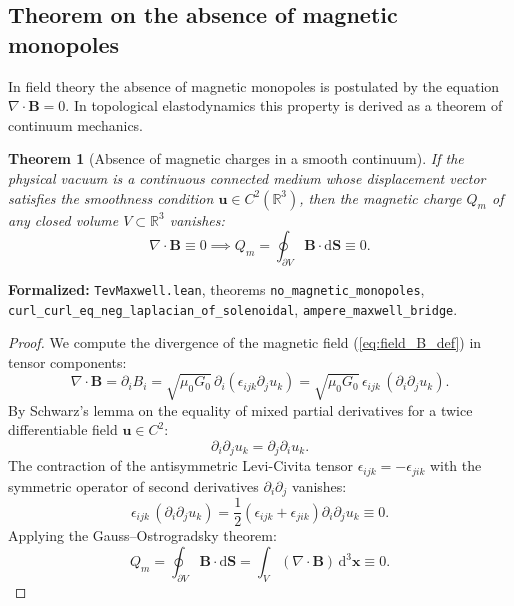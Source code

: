 \documentclass[11pt,a4paper]{article}
\newtheorem{theorem}{Theorem}
\theoremstyle{definition}
\theoremstyle{remark}
\begin{document}
\subsection{Theorem on the absence of magnetic monopoles}
	
In field theory the absence of magnetic monopoles is postulated by the equation $\nabla \cdot \mathbf{B} = 0$. In topological elastodynamics this property is derived as a theorem of continuum mechanics.
	
\begin{theorem}[Absence of magnetic charges in a smooth continuum]
\label{thm:no_monopoles}
If the physical vacuum is a continuous connected medium whose displacement vector satisfies the smoothness condition $\mathbf{u} \in C^2(\mathbb{R}^3)$, then the magnetic charge $Q_m$ of any closed volume $V \subset \mathbb{R}^3$ vanishes:
\begin{equation}
	\nabla \cdot \mathbf{B} \equiv 0 \implies Q_m = \oint_{\partial V} \mathbf{B} \cdot \mathrm{d}\mathbf{S} \equiv 0.
	\label{eq:div_B_zero_theorem}
\end{equation}
\end{theorem}

\noindent\small\textbf{Formalized:} \texttt{TevMaxwell.lean}, theorems \texttt{no\_magnetic\_monopoles}, \texttt{curl\_curl\_eq\_neg\_laplacian\_of\_solenoidal}, \texttt{ampere\_maxwell\_bridge}.


\begin{proof}
We compute the divergence of the magnetic field (\ref{eq:field_B_def}) in tensor components:
\begin{equation}
	\nabla \cdot \mathbf{B} = \partial_i B_i = \sqrt{\mu_0 G_0} \, \partial_i (\epsilon_{ijk} \partial_j u_k) = \sqrt{\mu_0 G_0} \, \epsilon_{ijk} \, (\partial_i \partial_j u_k).
\end{equation}
By Schwarz's lemma on the equality of mixed partial derivatives for a twice differentiable field $\mathbf{u} \in C^2$:
\begin{equation}
	\partial_i \partial_j u_k = \partial_j \partial_i u_k.
\end{equation}
The contraction of the antisymmetric Levi-Civita tensor $\epsilon_{ijk} = -\epsilon_{jik}$ with the symmetric operator of second derivatives $\partial_i \partial_j$ vanishes:
\begin{equation}
	\epsilon_{ijk} \, (\partial_i \partial_j u_k) = \frac{1}{2} (\epsilon_{ijk} + \epsilon_{jik}) \partial_i \partial_j u_k \equiv 0.
\end{equation}
Applying the Gauss--Ostrogradsky theorem:
\begin{equation}
	Q_m = \oint_{\partial V} \mathbf{B} \cdot \mathrm{d}\mathbf{S} = \int_V (\nabla \cdot \mathbf{B}) \, \mathrm{d}^3\mathbf{x} \equiv 0.
\end{equation}
\end{proof}
	
\end{document}
